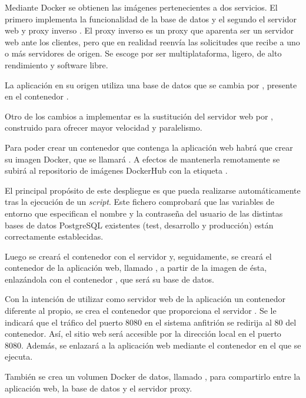 Mediante Docker se obtienen las imágenes pertenecientes a dos servicios. El primero implementa la funcionalidad de la base de datos  y el segundo el servidor web y proxy inverso . El proxy inverso es un proxy que aparenta ser un servidor web ante los clientes, pero que en realidad reenvía las solicitudes que recibe a uno o más servidores de origen. Se escoge  por ser multiplataforma, ligero, de alto rendimiento y software libre.

La aplicación en su origen utiliza una base de datos  que se cambia por , presente en el contenedor . 

Otro de los cambios a implementar es la sustitución del servidor web  por , construido para ofrecer mayor velocidad y paralelismo.

Para poder crear un contenedor que contenga la aplicación web habrá que crear su imagen Docker, que se llamará . A efectos de mantenerla remotamente se subirá al repositorio de imágenes DockerHub con la etiqueta .

El principal propósito de este despliegue es que pueda realizarse automáticamente tras la ejecución de un \textit{script}. Este fichero comprobará que las variables de entorno que especifican el nombre y la contraseña del usuario de las distintas bases de datos PostgreSQL existentes (test, desarrollo y producción) están correctamente establecidas.

Luego se creará el contenedor  con el servidor  y, seguidamente, se creará el contenedor de la aplicación web, llamado , a partir de la imagen de ésta, enlazándola con el contenedor , que será su base de datos.

Con la intención de utilizar como servidor web de la aplicación un contenedor diferente al propio, se crea el contenedor  que proporciona el servidor . Se le indicará que el tráfico del puerto 8080 en el sistema anfitrión se redirija al 80 del contenedor. Así, el sitio web será accesible por la dirección local en el puerto 8080. Además, se enlazará a la aplicación web mediante el contenedor en el que se ejecuta.

También se crea un volumen Docker de datos, llamado , para compartirlo entre la aplicación web, la base de datos y el servidor proxy.

